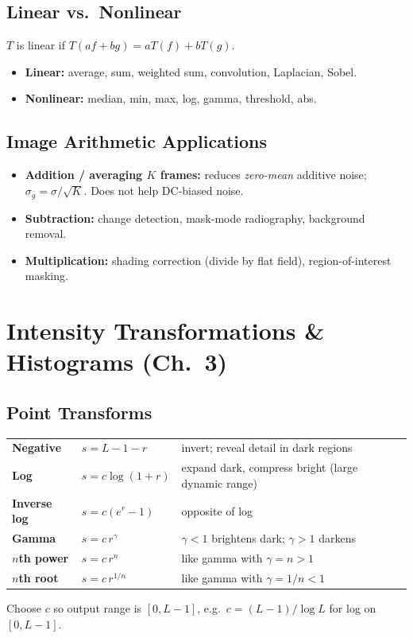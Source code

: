 \documentclass[10pt]{article}
\begin{document}
\subsection{Linear vs.\ Nonlinear}
$T$ is linear if $T(af + bg) = aT(f) + bT(g)$.
\begin{itemize}
  \item \textbf{Linear:} average, sum, weighted sum, convolution, Laplacian, Sobel.
  \item \textbf{Nonlinear:} median, min, max, log, gamma, threshold, abs.
\end{itemize}

\subsection{Image Arithmetic Applications}
\begin{itemize}
  \item \textbf{Addition / averaging $K$ frames:} reduces \emph{zero-mean} additive noise; $\sigma_{\bar{g}} = \sigma/\sqrt{K}$. Does not help DC-biased noise.
  \item \textbf{Subtraction:} change detection, mask-mode radiography, background removal.
  \item \textbf{Multiplication:} shading correction (divide by flat field), region-of-interest masking.
\end{itemize}

\section{Intensity Transformations \& Histograms (Ch.~3)}

\subsection{Point Transforms}
\begin{tcolorbox}[studybox]
\begin{tabular}{@{}lll@{}}
\textbf{Negative} & $s = L-1-r$ & invert; reveal detail in dark regions \\
\textbf{Log} & $s = c\log(1+r)$ & expand dark, compress bright (large dynamic range) \\
\textbf{Inverse log} & $s = c(e^r - 1)$ & opposite of log \\
\textbf{Gamma} & $s = c\, r^{\gamma}$ & $\gamma<1$ brightens dark; $\gamma>1$ darkens \\
\textbf{$n$th power} & $s = c\,r^n$ & like gamma with $\gamma=n>1$ \\
\textbf{$n$th root} & $s = c\,r^{1/n}$ & like gamma with $\gamma=1/n<1$ \\
\end{tabular}
\end{tcolorbox}
Choose $c$ so output range is $[0, L-1]$, e.g.\ $c = (L-1)/\log L$ for log on $[0,L-1]$.
\end{document}

